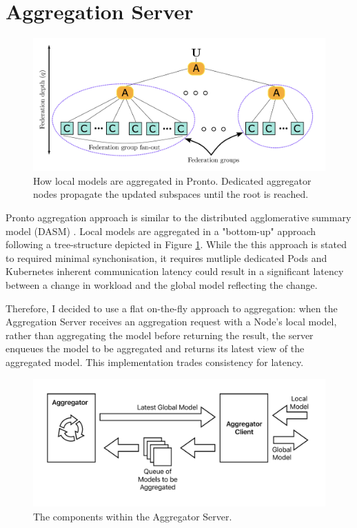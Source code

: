 \section{Aggregation Server}
\begin{figure}[H]
    \centering
    \includegraphics[width=\textwidth]{images/pronto-agg.png}
    \caption{How local models are aggregated in Pronto. Dedicated aggregator
    nodes propagate the updated subspaces until the root is reached.}
    \label{pronto-agg}
\end{figure}
Pronto aggregation approach is similar to the distributed agglomerative summary
model (DASM) \cite{}. Local models are aggregated in a "bottom-up" approach
following a tree-structure depicted in Figure \ref{pronto-agg}. While the
this approach is stated to required minimal synchonisation, it requires
mutliple dedicated Pods and Kubernetes inherent communication latency could
result in a significant latency between a change in workload and the global
model reflecting the change.

Therefore, I decided to use a flat on-the-fly approach to aggregation: when the
Aggregation Server receives an aggregation request with a Node's local model,
rather than aggregating the model before returning the result, the server
enqueues the model to be aggregated and returns its latest view of the
aggregated model. This implementation trades consistency for latency.

\begin{figure}[H]
    \centering
    \includegraphics[width=\textwidth]{images/spazio-agg.pdf}
    \caption{The components within the Aggregator Server.}
    \label{spazio-agg-components}
\end{figure}

